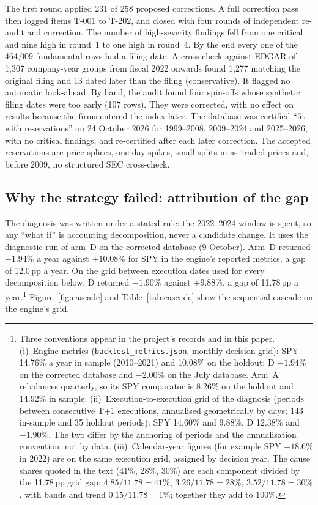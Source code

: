 \documentclass[11pt]{article}
\begin{document}
The first round applied 231 of 258 proposed corrections. A full correction pass then logged items T-001 to T-202, and closed with four rounds of independent re-audit and correction. The number of high-severity findings fell from one critical and nine high in round~1 to one high in round~4. By the end every one of the 464{,}009 fundamental rows had a filing date. A cross-check against EDGAR of 1{,}307 company-year groups from fiscal 2022 onwards found 1{,}277 matching the original filing and 13 dated later than the filing (conservative). It flagged no automatic look-ahead. By hand, the audit found four spin-offs whose synthetic filing dates were too early (107 rows). They were corrected, with no effect on results because the firms entered the index later. The database was certified ``fit with reservations'' on 24 October 2026 for 1999--2008, 2009--2024 and 2025--2026, with no critical findings, and re-certified after each later correction. The accepted reservations are price splices, one-day spikes, small splits in as-traded prices and, before 2009, no structured SEC cross-check.

\subsection{Why the strategy failed: attribution of the gap}

The diagnosis was written under a stated rule: the 2022--2024 window is spent, so any ``what if'' is accounting decomposition, never a candidate change. It uses the diagnostic run of arm~D on the corrected database (9 October). Arm~D returned $-1.94\%$ a year against $+10.08\%$ for SPY in the engine's reported metrics, a gap of 12.0\,pp a year. On the grid between execution dates used for every decomposition below, D returned $-1.90\%$ against $+9.88\%$, a gap of 11.78\,pp a year.\footnote{\label{fn:grids}Three conventions appear in the project's records and in this paper. (i)~Engine metrics (\texttt{backtest\_metrics.json}, monthly decision grid): SPY 14.76\% a year in sample (2010--2021) and 10.08\% on the holdout; D $-1.94\%$ on the corrected database and $-2.00\%$ on the July database. Arm~A rebalances quarterly, so its SPY comparator is 8.26\% on the holdout and 14.92\% in sample. (ii)~Execution-to-execution grid of the diagnosis (periods between consecutive T+1 executions, annualised geometrically by days; 143 in-sample and 35 holdout periods): SPY 14.60\% and 9.88\%, D 12.38\% and $-1.90\%$. The two differ by the anchoring of periods and the annualisation convention, not by data. (iii)~Calendar-year figures (for example SPY $-18.6\%$ in 2022) are on the same execution grid, assigned by decision year. The cause shares quoted in the text (41\%, 28\%, 30\%) are each component divided by the 11.78\,pp grid gap: $4.85/11.78=41\%$, $3.26/11.78=28\%$, $3.52/11.78=30\%$, with bands and trend $0.15/11.78=1\%$; together they add to 100\%.} Figure~\ref{fig:cascade} and Table~\ref{tab:cascade} show the sequential cascade on the engine's grid.
\end{document}
